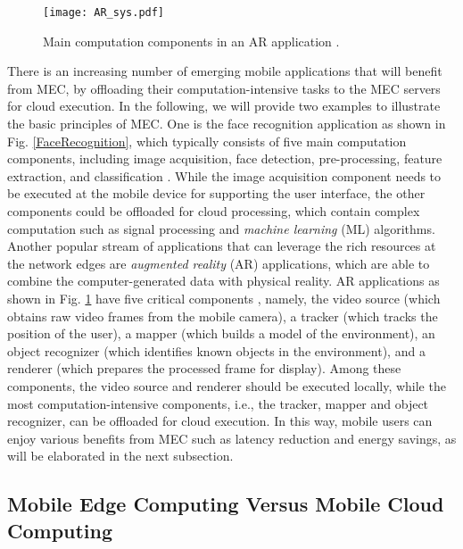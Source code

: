 \documentclass[journal]{IEEEtran}
\begin{document}
\begin{figure}[!t]
\begin{center}
   \texttt{[image: AR\_sys.pdf]}
\end{center}
\caption{Main computation components in an AR application \cite{Verbelen1310}.}
\label{ARCompo}
\end{figure}

There is an increasing number of emerging mobile applications that will benefit from MEC, by offloading their computation-intensive tasks to the MEC servers for cloud execution. In the following, we will provide two examples to illustrate the basic principles of MEC. One is the face recognition application as shown in Fig. \ref{FaceRecognition}, which typically consists of five main computation components, including image acquisition, face detection, pre-processing, feature extraction, and classification \cite{Jaber1405}. While the image acquisition component needs to be executed at the mobile device for supporting the user interface, the other components could be offloaded for cloud processing, which contain complex computation such as signal processing and \emph{machine learning} (ML) algorithms. Another popular stream of applications that can leverage the rich resources at the network edges are \emph{augmented reality} (AR) applications, which are able to combine the computer-generated data with physical reality. AR applications as shown in Fig. \ref{ARCompo} have five critical components \cite{Verbelen1310,ShuwailiAR16,ali2017energy}, namely, the video source (which obtains raw video frames from the mobile camera), a tracker (which tracks the position of the user), a mapper (which builds a model of the environment), an object recognizer (which identifies known objects in the environment), and a renderer (which prepares the processed frame for display). Among these components, the video source and renderer should be executed locally, while the most computation-intensive components, i.e., the tracker, mapper and object recognizer, can be offloaded for cloud execution. In this way, mobile users can enjoy various benefits from MEC such as latency reduction and energy savings, as will be elaborated in the next subsection.


\subsection{Mobile Edge Computing Versus Mobile Cloud Computing}
\end{document}

